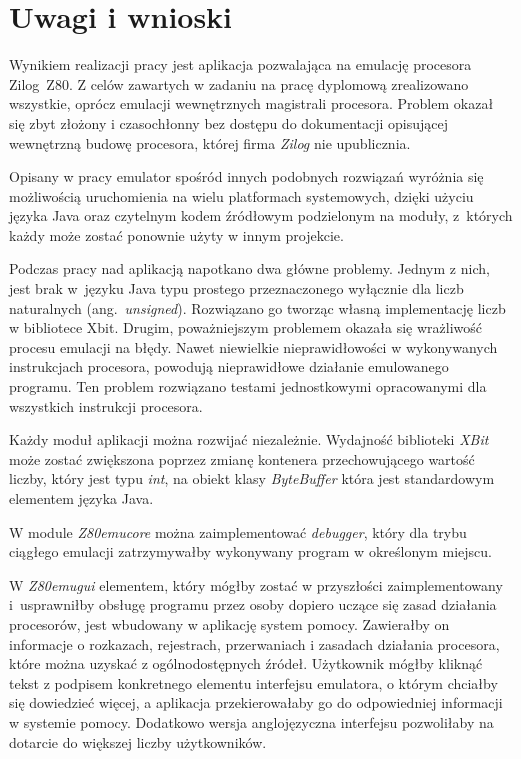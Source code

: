 \chapter{Uwagi i wnioski}

      Wynikiem realizacji pracy jest aplikacja pozwalająca na emulację procesora Zilog~Z80. Z celów zawartych w zadaniu na pracę dyplomową zrealizowano wszystkie, oprócz emulacji wewnętrznych magistrali procesora. Problem okazał się zbyt złożony i czasochłonny bez dostępu do dokumentacji opisującej wewnętrzną budowę procesora, której firma \emph{Zilog} nie upublicznia.
      
      Opisany w pracy emulator spośród innych podobnych rozwiązań wyróżnia się możliwością uruchomienia na wielu platformach systemowych, dzięki użyciu języka Java oraz czytelnym kodem źródłowym podzielonym na moduły, z~których każdy może zostać ponownie użyty w innym projekcie.
      
      Podczas pracy nad aplikacją napotkano dwa główne problemy. Jednym z nich, jest brak w~języku Java typu prostego przeznaczonego wyłącznie dla liczb naturalnych (ang.~\emph{unsigned}). Rozwiązano go tworząc własną implementację liczb w bibliotece Xbit. Drugim, poważniejszym problemem okazała się wrażliwość procesu emulacji na błędy. Nawet niewielkie nieprawidłowości w wykonywanych instrukcjach procesora, powodują nieprawidłowe działanie emulowanego programu. Ten problem rozwiązano testami jednostkowymi opracowanymi dla wszystkich instrukcji procesora.
      
      Każdy moduł aplikacji można rozwijać niezależnie. Wydajność biblioteki \emph{XBit} może zostać zwiększona poprzez zmianę kontenera przechowującego wartość liczby, który jest typu \emph{int}, na obiekt klasy \emph{ByteBuffer} która jest standardowym elementem języka Java.
      
      W module \emph{Z80emu{\dywiz}core} można zaimplementować \emph{debugger}, który dla trybu ciągłego emulacji zatrzymywałby wykonywany program w określonym miejscu.
      
      W \emph{Z80emu{\dywiz}gui} elementem, który mógłby zostać w przyszłości zaimplementowany i~usprawniłby obsługę programu przez osoby dopiero uczące się zasad działania procesorów, jest wbudowany w aplikację system pomocy. Zawierałby on informacje o rozkazach, rejestrach, przerwaniach i zasadach działania procesora, które można uzyskać z ogólnodostępnych źródeł. Użytkownik mógłby kliknąć tekst z podpisem konkretnego elementu interfejsu emulatora, o którym chciałby się dowiedzieć więcej, a aplikacja przekierowałaby go do odpowiedniej informacji w systemie pomocy. Dodatkowo wersja anglojęzyczna interfejsu pozwoliłaby na dotarcie do większej liczby użytkowników.